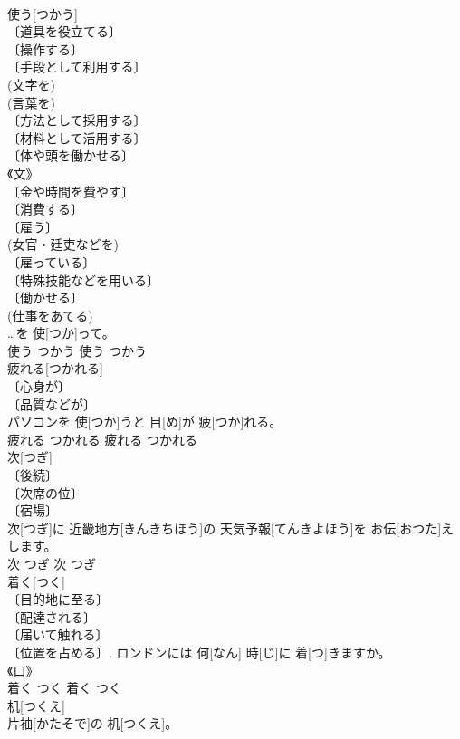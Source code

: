 \documentclass[8pt]{extreport}
\begin{document}
\begin{CJK}{UTF8}{min}
\\	使う[つかう]	
\\	〔道具を役立てる〕 
\\	〔操作する〕 
\\	〔手段として利用する〕 
\\	(文字を) 
\\	(言葉を) 
\\	〔方法として採用する〕 
\\	〔材料として活用する〕 
\\	〔体や頭を働かせる〕 
\\	《文》 
\\	〔金や時間を費やす〕 
\\	〔消費する〕 
\\	〔雇う〕 
\\	(女官・廷吏などを) 
\\	〔雇っている〕 
\\	〔特殊技能などを用いる〕 
\\	〔働かせる〕 
\\	(仕事をあてる) 
\\	…を 使[つか]って。	
\\	使う	つかう	使う	つかう	
\\	疲れる[つかれる]	
\\	〔心身が〕 
\\	〔品質などが〕 
\\	[⇒くたびれる 
\\	長時間[ちょうじかん]パソコンを 使[つか]うと 目[め]が 疲[つか]れる。	
\\	疲れる	つかれる	疲れる	つかれる	
\\	次[つぎ]	
\\	〔後続〕 
\\	〔次席の位〕 
\\	〔宿場〕 
\\	次[つぎ]に 近畿地方[きんきちほう]の 天気予報[てんきよほう]を お伝[おつた]えします。	
\\	次	つぎ	次	つぎ	
\\	着く[つく]	
\\	〔目的地に至る〕 
\\	〔配達される〕 
\\	〔届いて触れる〕 
\\	〔位置を占める〕.	ロンドンには 何[なん] 時[じ]に 着[つ]きますか。	
\\	《口》 
\\	着く	つく	着く	つく	
\\	机[つくえ]	
\\	片袖[かたそで]の 机[つくえ]。	

\end{CJK}
\end{document}
